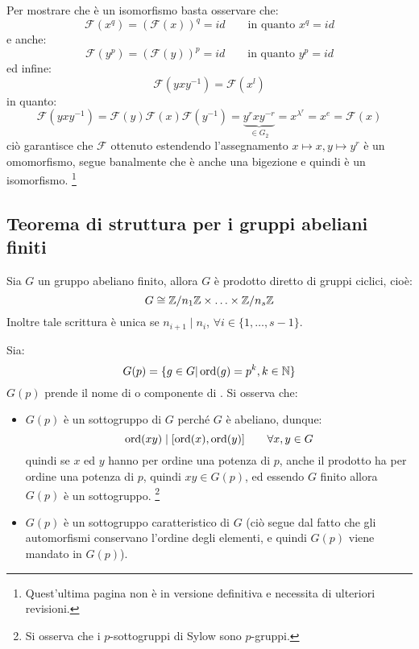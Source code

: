 \documentclass[11pt]{scrartcl}
\begin{document}
Per mostrare che è un isomorfismo basta osservare che:
    \[ \mathcal{F}(x^q) = (\mathcal{F}(x))^q = id \qquad \text{in quanto $x^q = id$}
        \]
e anche:
    \[ \mathcal{F}(y^p) = (\mathcal{F}(y))^p = id \qquad \text{in quanto $y^p = id$}
        \]
ed infine:
    \[ \mathcal{F}(yxy^{-1}) = \mathcal{F}(x^l)
        \]
in quanto:
    \[ \mathcal{F}(yxy^{-1}) = \mathcal{F}(y) \mathcal{F}(x) \mathcal{F}(y^{-1}) = \underbrace{y^rxy^{-r}}_{\in G_2} = x^{\lambda^{r}} = x^e = \mathcal{F}(x)
        \]
ciò garantisce che $\mathcal{F}$ ottenuto estendendo l'assegnamento $x \longmapsto x, y \longmapsto y^r$ è un omomorfismo, segue banalmente che è anche una bigezione e quindi è un isomorfismo. \footnote{Quest'ultima pagina non è in versione 
definitiva e necessita di ulteriori revisioni.}

\newpage
\subsection{Teorema di struttura per i gruppi abeliani finiti}

\begin{theorem}
    \label{t:struttura}
    Sia $G$ un gruppo abeliano finito, allora $G$ è prodotto diretto di gruppi ciclici, cioè:
        \[ G \cong \mathbb{Z}/{n_1}\mathbb{Z} \times \ldots \times \mathbb{Z}/{n_s}\mathbb{Z}
            \]
    Inoltre tale scrittura è unica se $n_{i+1} \mid n_i$, $\forall i \in \{1,\ldots,s-1\}$.
\end{theorem}

\begin{remark}
    Sia:
        \[ G(p) = \{g \in G | \operatorname{ord}(g) = p^k, k \in \mathbb N\}
            \]
    $G(p)$ prende il nome di  o componente di .
    Si osserva che:
        \begin{itemize}
            \item $G(p)$ è un sottogruppo di $G$ perché $G$ è abeliano, dunque:
                \[ \operatorname{ord}(xy) \mid [\operatorname{ord}(x),\operatorname{ord}(y)] \qquad \forall x,y \in G
                    \]
                quindi se $x$ ed $y$ hanno per ordine una potenza di $p$, anche il prodotto ha per ordine una potenza di $p$, quindi $xy \in G(p)$, ed essendo 
                $G$ finito allora $G(p)$ è un sottogruppo. \footnote{Si osserva che i $p$-sottogruppi di Sylow sono $p$-gruppi.}
            \item $G(p)$ è un sottogruppo caratteristico di $G$ (ciò segue dal fatto che gli automorfismi conservano l'ordine degli elementi, e quindi $G(p)$ viene mandato in $G(p)$).
        \end{itemize}
\end{remark}
\end{document}
